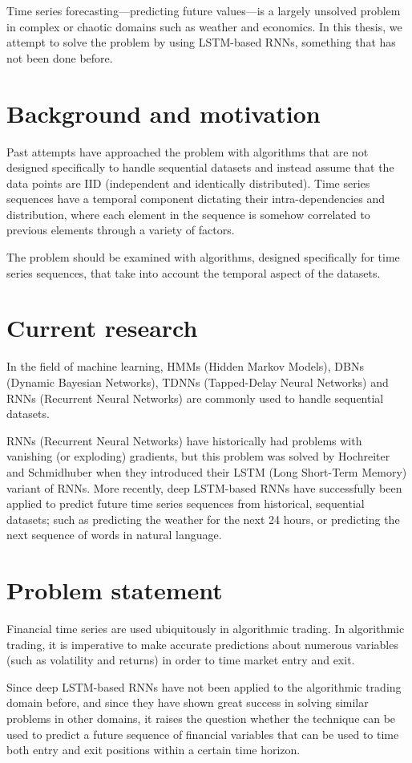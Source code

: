 Time series forecasting---predicting future values---is a largely unsolved problem in complex or chaotic domains such as weather and economics. In this thesis, we attempt to solve the problem by using LSTM-based RNNs, something that has not been done before.

\section{Background and motivation}
Past attempts have approached the problem with algorithms that are not designed specifically to handle sequential datasets and instead assume that the data points are IID (independent and identically distributed). Time series sequences have a temporal component dictating their intra-dependencies and distribution, where each element in the sequence is somehow correlated to previous elements through a variety of factors.

The problem should be examined with algorithms, designed specifically for time series sequences, that take into account the temporal aspect of the datasets.

\section{Current research}
In the field of machine learning, HMMs (Hidden Markov Models), DBNs (Dynamic Bayesian Networks), TDNNs (Tapped-Delay Neural Networks) and RNNs (Recurrent Neural Networks) are commonly used to handle sequential datasets.

RNNs (Recurrent Neural Networks) have historically had problems with vanishing (or exploding) gradients, but this problem was solved by Hochreiter and Schmidhuber when they introduced their LSTM (Long Short-Term Memory) variant of RNNs. More recently, deep LSTM-based RNNs have successfully been applied to predict future time series sequences from historical, sequential datasets; such as predicting the weather for the next 24 hours, or predicting the next sequence of words in natural language.

\section{Problem statement}
Financial time series are used ubiquitously in algorithmic trading. In algorithmic trading, it is imperative to make accurate predictions about numerous variables (such as volatility and returns) in order to time market entry and exit.

Since deep LSTM-based RNNs have not been applied to the algorithmic trading domain before, and since they have shown great success in solving similar problems in other domains, it raises the question whether the technique can be used to predict a future sequence of financial variables that can be used to time both entry and exit positions within a certain time horizon.
